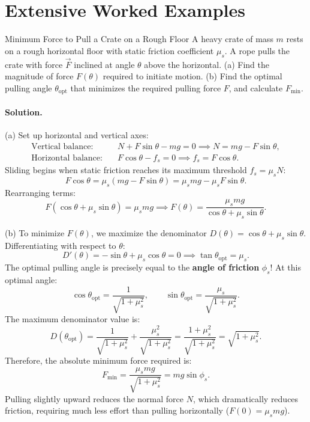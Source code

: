 \section{Extensive Worked Examples}

\begin{workedexample}{Minimum Force to Pull a Crate on a Rough Floor}
A heavy crate of mass $m$ rests on a rough horizontal floor with static friction coefficient $\mu_s$. A rope pulls the crate with force $\vec{F}$ inclined at angle $\theta$ above the horizontal.
(a) Find the magnitude of force $F(\theta)$ required to initiate motion.
(b) Find the optimal pulling angle $\theta_{\text{opt}}$ that minimizes the required pulling force $F$, and calculate $F_{\min}$.

\paragraph{Solution.}

(a) Set up horizontal and vertical axes:
\begin{align*}
\text{Vertical balance:}\quad & N + F\sin\theta - mg = 0 \implies N = mg - F\sin\theta, \\
\text{Horizontal balance:}\quad & F\cos\theta - f_s = 0 \implies f_s = F\cos\theta.
\end{align*}
Sliding begins when static friction reaches its maximum threshold $f_s = \mu_s N$:
\[
F\cos\theta = \mu_s(mg - F\sin\theta) = \mu_s mg - \mu_s F\sin\theta.
\]
Rearranging terms:
\[
F(\cos\theta + \mu_s\sin\theta) = \mu_s mg \implies \boxed{F(\theta) = \frac{\mu_s mg}{\cos\theta + \mu_s\sin\theta}.}
\]

(b) To minimize $F(\theta)$, we maximize the denominator $D(\theta) = \cos\theta + \mu_s\sin\theta$.
Differentiating with respect to $\theta$:
\[
D'(\theta) = -\sin\theta + \mu_s\cos\theta = 0 \implies \boxed{\tan\theta_{\text{opt}} = \mu_s.}
\]
The optimal pulling angle is precisely equal to the \textbf{angle of friction} $\phi_s$!
At this optimal angle:
\[
\cos\theta_{\text{opt}} = \frac{1}{\sqrt{1 + \mu_s^2}}, \qquad \sin\theta_{\text{opt}} = \frac{\mu_s}{\sqrt{1 + \mu_s^2}}.
\]
The maximum denominator value is:
\[
D(\theta_{\text{opt}}) = \frac{1}{\sqrt{1 + \mu_s^2}} + \frac{\mu_s^2}{\sqrt{1 + \mu_s^2}} = \frac{1 + \mu_s^2}{\sqrt{1 + \mu_s^2}} = \sqrt{1 + \mu_s^2}.
\]
Therefore, the absolute minimum force required is:
\[
\boxed{F_{\min} = \frac{\mu_s mg}{\sqrt{1 + \mu_s^2}} = mg\sin\phi_s.}
\]
Pulling slightly upward reduces the normal force $N$, which dramatically reduces friction, requiring much less effort than pulling horizontally ($F(0) = \mu_s mg$).
\end{workedexample}

